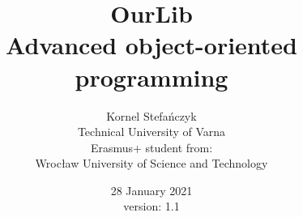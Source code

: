 


\title{OurLib\\ \large{Advanced object-oriented programming}}
\author{Kornel Stefańczyk 
\\Technical University of Varna
\\ Erasmus+ student from: 
\\ Wrocław University of Science and Technology}
\date{28 January 2021 \\version: 1.1}



\maketitle
\newpage
\tableofcontents
\newpage









